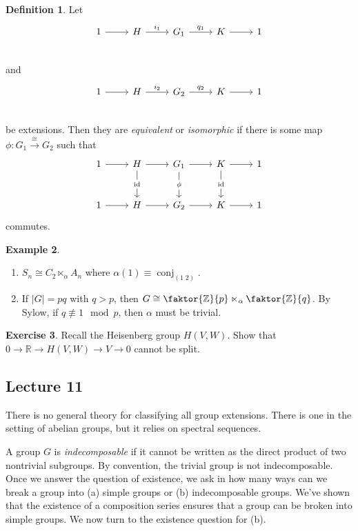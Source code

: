 \documentclass[10pt,letterpaper,cm]{nupset}
\theoremstyle{definition}
\newtheorem{definition}{Definition}[subsection]
\newtheorem{exmp}[definition]{Example}
\theoremstyle{theorem}
\newtheorem{exercise}[definition]{Exercise}
\theoremstyle{remark}
\newcommand{\R}{\mathbb R}
\newcommand{\Z}{\mathbb Z}
\newcommand{\1}{\mathbf{1}}
\newcommand{\0}{\vec 0}
\DeclareMathOperator{\id}{\mathrm{id}}
\DeclareMathOperator{\conj}{conj}
\begin{document}
\begin{definition}
Let \[
	\begin{tikzcd}
	1\rar &H\rar["i_1" above] & G_1 \rar["q_1" above] & K\rar& 1 \\
	\end{tikzcd}
\]
and 
\[
	\begin{tikzcd}
	1\rar &H\rar["i_2" above] & G_2 \rar["q_2" above] & K\rar& 1 \\
	\end{tikzcd}
\]
be extensions. Then they are \textit{equivalent} or \textit{isomorphic} if there is some map $\phi : G_1 \overset{\cong}{\longrightarrow} G_2$ such that 
\[
\begin{tikzcd}[row sep =large]
1 \arrow[r] & H \arrow[r] \arrow[d, "\id" description] & G_1 \arrow[r] \arrow[d, "\phi" description] & K \arrow[r] \arrow[d, "\id" description] & 1 \\
1 \arrow[r] & H \arrow[r] & G_2 \arrow[r] & K \arrow[r] & 1
\end{tikzcd}
\]
commutes.
\end{definition}

\begin{exmp} $ $
\begin{enumerate}
\item $S_n \cong C_2 \ltimes_{\alpha} A_n$ where $\alpha(1) \equiv \conj_{(1 \; 2)}$.
\item  If $\lvert{G}\rvert = pq$ with $q>p$, then $G \cong \faktor{\Z}{p} \ltimes_{\alpha} \faktor{\Z}{q}$. By Sylow,  if $q\not \equiv 1 \mod p$, then $\alpha$ must be trivial. 
\end{enumerate}
\end{exmp}

\begin{exercise}
Recall  the Heisenberg group  $H(V, W)$. Show that $0 \to \R \to H(V, W) \to V \to 0$ cannot be split.
\end{exercise}

\subsection{Lecture 11}

There is no general theory for classifying all group extensions. There is one in the setting of abelian groups, but it relies on spectral sequences.

A group $G$ is \textit{indecomposable} if it cannot be written as the direct product of two nontrivial subgroups. By convention, the trivial group is not indecomposable. 
Once we answer the question of existence, we ask in how many ways can we break a group into (a) simple groups or (b) indecomposable groups. We've shown that the existence of a composition series ensures that a group can be broken into simple groups. We now turn to the existence question for (b).
\end{document}

